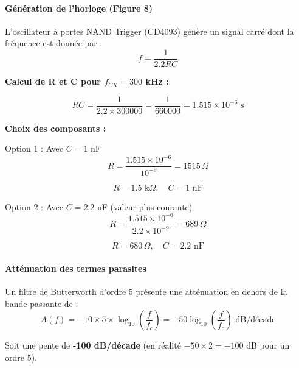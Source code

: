 \documentclass[11pt,a4paper]{article}
\begin{document}
\paragraph{Génération de l'horloge (Figure 8)}

L'oscillateur à portes NAND Trigger (CD4093) génère un signal carré dont la fréquence est donnée par :
\begin{equation}
f = \frac{1}{2.2 RC}
\end{equation}

\textbf{Calcul de R et C pour $f_{CK} = 300$ kHz :}

\begin{equation}
RC = \frac{1}{2.2 \times 300000} = \frac{1}{660000} = 1.515 \times 10^{-6} \text{ s}
\end{equation}

\textbf{Choix des composants :}

Option 1 : Avec $C = 1$ nF
\begin{equation}
R = \frac{1.515 \times 10^{-6}}{10^{-9}} = 1515 \, \Omega
\end{equation}

\begin{equation}
\boxed{R = 1.5 \text{ k}\Omega, \quad C = 1 \text{ nF}}
\end{equation}

Option 2 : Avec $C = 2.2$ nF (valeur plus courante)
\begin{equation}
R = \frac{1.515 \times 10^{-6}}{2.2 \times 10^{-9}} = 689 \, \Omega
\end{equation}

\begin{equation}
\boxed{R = 680 \, \Omega, \quad C = 2.2 \text{ nF}}
\end{equation}

\paragraph{Atténuation des termes parasites}

Un filtre de Butterworth d'ordre 5 présente une atténuation en dehors de la bande passante de :
\begin{equation}
A(f) = -10 \times 5 \times \log_{10}\left(\frac{f}{f_c}\right) = -50 \log_{10}\left(\frac{f}{f_c}\right) \text{ dB/décade}
\end{equation}

Soit une pente de \textbf{-100 dB/décade} (en réalité $-50 \times 2 = -100$ dB pour un ordre 5).
\end{document}
